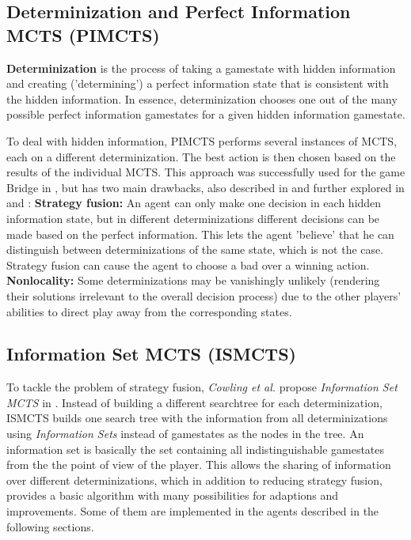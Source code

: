 \subsection{Determinization and Perfect Information MCTS (PIMCTS)}
\textbf{Determinization} is the process of taking a gamestate with hidden information and creating ('determining') a perfect information state that is consistent with the hidden information. In essence, determinization chooses one out of the many possible perfect information gamestates for a given hidden information gamestate.

To deal with hidden information, PIMCTS performs several instances of MCTS, each on a different determinization. The best action is then chosen based on the results of the individual MCTS.
This approach was successfully used for the game Bridge in \cite{bridge}, but has two main drawbacks, also described in \cite{bridge} and further explored in \cite{pimcts} and \cite{ismcts}:
\newline\textbf{Strategy fusion:} An agent can only make one decision in each hidden information state, but in different determinizations different decisions can be made based on the perfect information. This lets the agent 'believe' that he can distinguish between determinizations of the same state, which is not the case. Strategy fusion can cause the agent to choose a bad over a winning action.
\newline\textbf{Nonlocality:} Some determinizations may be vanishingly unlikely (rendering their solutions irrelevant to the overall decision process) due to the other players’ abilities to direct play away from the corresponding states.

\subsection{Information Set MCTS (ISMCTS)}
To tackle the problem of strategy fusion, \textit{Cowling et al.} propose \textit{Information Set MCTS} in \cite{ismcts}. Instead of building a different searchtree for each determinization, ISMCTS builds one search tree with the information from all determinizations using \textit{Information Sets} instead of gamestates as the nodes in the tree. An information set is basically the set containing all indistinguishable gamestates from the the point of view of the player. This allows the sharing of information over different determinizations, which in addition to reducing strategy fusion, provides a basic algorithm with many possibilities for adaptions and improvements. Some of them are implemented in the agents described in the following sections.


